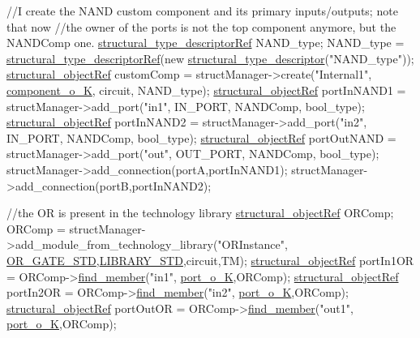 \begin{DoxyCode}
\textcolor{comment}{//I create the NAND custom component and its primary inputs/outputs; note that now}
\textcolor{comment}{//the owner of the ports is not the top component anymore, but the NANDComp one.}
\hyperlink{structrefcount}{structural\_type\_descriptorRef} NAND\_type;
NAND\_type = \hyperlink{structural__objects_8hpp_a219296792577e3292783725961506c83}{structural\_type\_descriptorRef}(\textcolor{keyword}{new} 
      \hyperlink{structstructural__type__descriptor}{structural\_type\_descriptor}(\textcolor{stringliteral}{"NAND\_type"}));
\hyperlink{structrefcount}{structural\_objectRef} customComp = structManager->create(\textcolor{stringliteral}{"Internal1"}, 
      \hyperlink{structural__objects_8hpp_acf52399aecacb7952e414c5746ce6439a245c4ad59cb98085da034d85a4049427}{component\_o\_K}, circuit, NAND\_type);
\hyperlink{structrefcount}{structural\_objectRef} portInNAND1 = structManager->add\_port(\textcolor{stringliteral}{"in1"}, IN\_PORT, NANDComp, 
      bool\_type);
\hyperlink{structrefcount}{structural\_objectRef} portInNAND2 = structManager->add\_port(\textcolor{stringliteral}{"in2"}, IN\_PORT, NANDComp, 
      bool\_type);
\hyperlink{structrefcount}{structural\_objectRef} portOutNAND = structManager->add\_port(\textcolor{stringliteral}{"out"}, OUT\_PORT, NANDComp, 
      bool\_type);
structManager->add\_connection(portA,portInNAND1);
structManager->add\_connection(portB,portInNAND2);

\textcolor{comment}{//the OR is present in the technology library}
\hyperlink{structrefcount}{structural\_objectRef} ORComp;
ORComp = structManager->add\_module\_from\_technology\_library(\textcolor{stringliteral}{"ORInstance"},
      \hyperlink{technology__node_8hpp_a87cd9ed4dfee4f2e1b5038b2481a0389}{OR\_GATE\_STD},\hyperlink{technology__manager_8hpp_a0033bdd1d1c034f88d486516cd90f614}{LIBRARY\_STD},circuit,TM);
\hyperlink{structrefcount}{structural\_objectRef} portIn1OR = ORComp->\hyperlink{classstructural__object_a3a8b2d38c2b5666700053a72868bb6b2}{find\_member}(\textcolor{stringliteral}{"in1"},
      \hyperlink{structural__objects_8hpp_acf52399aecacb7952e414c5746ce6439acdcc7e8708a89b5424ed8b41c47f19b0}{port\_o\_K},ORComp);
\hyperlink{structrefcount}{structural\_objectRef} portIn2OR = ORComp->\hyperlink{classstructural__object_a3a8b2d38c2b5666700053a72868bb6b2}{find\_member}(\textcolor{stringliteral}{"in2"},
      \hyperlink{structural__objects_8hpp_acf52399aecacb7952e414c5746ce6439acdcc7e8708a89b5424ed8b41c47f19b0}{port\_o\_K},ORComp);
\hyperlink{structrefcount}{structural\_objectRef} portOutOR = ORComp->\hyperlink{classstructural__object_a3a8b2d38c2b5666700053a72868bb6b2}{find\_member}(\textcolor{stringliteral}{"out1"},
      \hyperlink{structural__objects_8hpp_acf52399aecacb7952e414c5746ce6439acdcc7e8708a89b5424ed8b41c47f19b0}{port\_o\_K},ORComp);


\end{DoxyCode}
